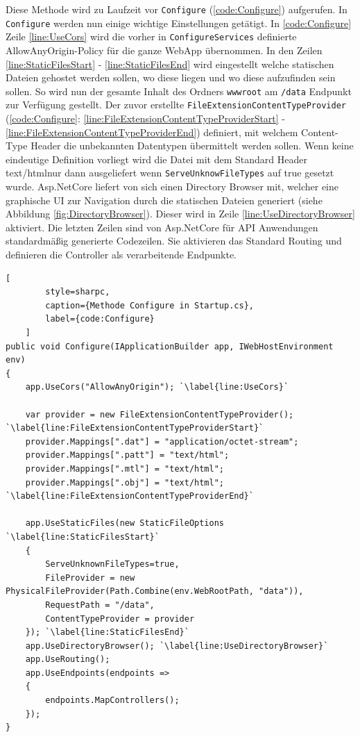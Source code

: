 Diese Methode wird zu Laufzeit vor \texttt{Configure}
(\lstlistingname\space \ref{code:Configure}) aufgerufen. In \texttt{Configure} werden nun
einige wichtige Einstellungen getätigt. In \lstlistingname\space \ref{code:Configure}
Zeile \ref{line:UseCors} wird die vorher in \texttt{ConfigureServices} definierte
\grqq AllowAnyOrigin\grqq -Policy für die ganze WebApp übernommen.
In den Zeilen \ref{line:StaticFilesStart} - \ref{line:StaticFilesEnd}
wird eingestellt welche statischen Dateien gehostet werden sollen,
wo diese liegen und wo diese aufzufinden sein sollen. So wird nun
der gesamte Inhalt des Ordners \texttt{wwwroot} am \texttt{/data} Endpunkt zur
Verfügung gestellt. Der zuvor erstellte \texttt{FileExtensionContentTypeProvider}
(\lstlistingname\space \ref{code:Configure}:
\ref{line:FileExtensionContentTypeProviderStart} -
\ref{line:FileExtensionContentTypeProviderEnd})
definiert, mit welchem Content-Type Header die \grqq unbekannten\grqq\space
Datentypen übermittelt werden sollen. Wenn keine eindeutige
Definition vorliegt wird die Datei mit dem Standard Header
\grqq text/html\grqq\space nur dann ausgeliefert wenn \texttt{ServeUnknowFileTypes} auf
true gesetzt wurde.
Asp.NetCore liefert von sich einen Directory Browser mit,
welcher eine graphische UI zur Navigation durch die statischen
Dateien generiert (siehe Abbildung \ref{fig:DirectoryBrowser}).
Dieser wird in Zeile \ref{line:UseDirectoryBrowser} aktiviert.
Die letzten Zeilen sind von Asp.NetCore für API Anwendungen
standardmäßig generierte Codezeilen. Sie aktivieren das Standard
Routing und definieren die Controller als verarbeitende Endpunkte.

\begin{codeblock}
	\begin{lstlisting}[
		style=sharpc,
		caption={Methode Configure in Startup.cs},
		label={code:Configure}
	]
public void Configure(IApplicationBuilder app, IWebHostEnvironment env)
{
	app.UseCors("AllowAnyOrigin"); `\label{line:UseCors}`

	var provider = new FileExtensionContentTypeProvider(); `\label{line:FileExtensionContentTypeProviderStart}`
	provider.Mappings[".dat"] = "application/octet-stream";
	provider.Mappings[".patt"] = "text/html";
	provider.Mappings[".mtl"] = "text/html";
	provider.Mappings[".obj"] = "text/html"; `\label{line:FileExtensionContentTypeProviderEnd}`

	app.UseStaticFiles(new StaticFileOptions `\label{line:StaticFilesStart}`
	{
		ServeUnknownFileTypes=true,
		FileProvider = new PhysicalFileProvider(Path.Combine(env.WebRootPath, "data")),
		RequestPath = "/data",
		ContentTypeProvider = provider
	}); `\label{line:StaticFilesEnd}`
	app.UseDirectoryBrowser(); `\label{line:UseDirectoryBrowser}`
	app.UseRouting();
	app.UseEndpoints(endpoints =>
	{
		endpoints.MapControllers();
	});
}
	\end{lstlisting}
\end{codeblock}

